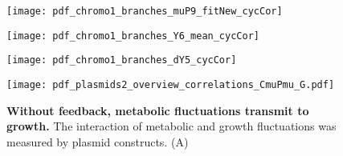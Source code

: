 \clearpage



\begin{figure}
	\centering
	\texttt{[image: pdf\_chromo1\_branches\_muP9\_fitNew\_cycCor]}
	\clearpage %
	\label{fig:XXX:XXX}
\end{figure}	

\clearpage



\begin{figure}
	\centering
	\texttt{[image: pdf\_chromo1\_branches\_Y6\_mean\_cycCor]}
	\clearpage %
	\label{fig:XXX:XXX}
\end{figure}	

\clearpage



\begin{figure}
	\centering
	\texttt{[image: pdf\_chromo1\_branches\_dY5\_cycCor]}
	\clearpage %
	\label{fig:XXX:XXX}
\end{figure}	

\clearpage






\begin{figure}
	\centering
	\texttt{[image: pdf\_plasmids2\_overview\_correlations\_CmuPmu\_G.pdf]}
	\caption{ 
		\textbf{Without feedback, metabolic fluctuations transmit to growth.}
		The interaction of metabolic and growth fluctuations was measured by plasmid constructs.
		(A) 
	}
	\label{fig:CRP:plasmidCCs}
\end{figure}



